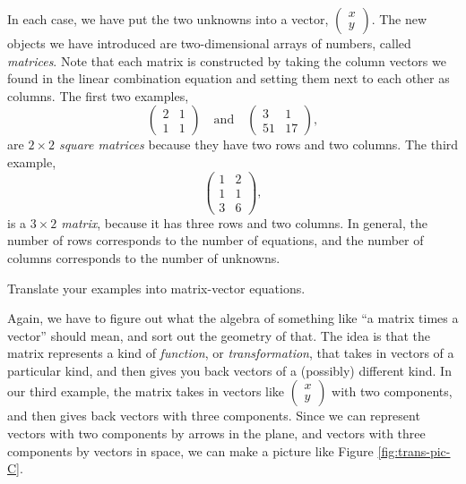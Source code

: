 \documentclass[elementsmain.tex]{subfiles}
\begin{document}
In each case, we have put the two unknowns into a vector, $\left(\begin{smallmatrix} x \\ y \end{smallmatrix}\right)$. The new objects we have introduced are two-dimensional arrays of numbers, called \emph{matrices}. Note that each matrix is constructed by taking the column vectors we found in the linear combination equation and setting them next to each other as columns. The first two examples,
\[
\begin{pmatrix} 2 & 1 \\ 1 & 1 \end{pmatrix} \quad \text{and} \quad \begin{pmatrix} 3 & 1 \\ 51 & 17 \end{pmatrix},
\]
are \emph{$2\times 2$ square matrices} because they have two rows and two columns. The third example, 
\[
\begin{pmatrix}1 & 2 \\ 1 & 1 \\ 3 & 6 \end{pmatrix},
\]
is a \emph{$3 \times 2$ matrix}, because it has three rows and two columns.
In general, the number of rows corresponds to the number of equations, and the number of columns corresponds to the number of unknowns.

\begin{readingex}
Translate your examples into matrix-vector equations.
\end{readingex}


Again, we have to figure out what the algebra of something like ``a matrix times a vector'' should mean, and sort out the geometry of that. The idea is that the matrix represents a kind of \emph{function}, or \emph{transformation}, that takes in vectors of a particular kind, and then gives you back vectors of a (possibly) different kind. In our third example, the matrix takes in vectors like $\left(\begin{smallmatrix} x \\ y \end{smallmatrix}\right)$ with two components, and then gives back vectors with three components.  Since we can represent vectors with two components by arrows in the plane, and vectors with three components by vectors in space, we can make a picture like Figure \ref{fig:trans-pic-C}.
\end{document}
